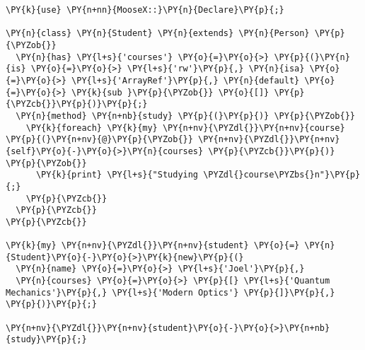 \begin{Verbatim}[commandchars=\\\{\}]
\PY{k}{use} \PY{n+nn}{MooseX::}\PY{n}{Declare}\PY{p}{;}

\PY{n}{class} \PY{n}{Student} \PY{n}{extends} \PY{n}{Person} \PY{p}{\PYZob{}}
  \PY{n}{has} \PY{l+s}{'courses'} \PY{o}{=}\PY{o}{>} \PY{p}{(}\PY{n}{is} \PY{o}{=}\PY{o}{>} \PY{l+s}{'rw'}\PY{p}{,} \PY{n}{isa} \PY{o}{=}\PY{o}{>} \PY{l+s}{'ArrayRef'}\PY{p}{,} \PY{n}{default} \PY{o}{=}\PY{o}{>} \PY{k}{sub }\PY{p}{\PYZob{}} \PY{o}{[]} \PY{p}{\PYZcb{}}\PY{p}{)}\PY{p}{;}
  \PY{n}{method} \PY{n+nb}{study} \PY{p}{(}\PY{p}{)} \PY{p}{\PYZob{}}
    \PY{k}{foreach} \PY{k}{my} \PY{n+nv}{\PYZdl{}}\PY{n+nv}{course} \PY{p}{(}\PY{n+nv}{@}\PY{p}{\PYZob{}} \PY{n+nv}{\PYZdl{}}\PY{n+nv}{self}\PY{o}{-}\PY{o}{>}\PY{n}{courses} \PY{p}{\PYZcb{}}\PY{p}{)} \PY{p}{\PYZob{}}
      \PY{k}{print} \PY{l+s}{"Studying \PYZdl{}course\PYZbs{}n"}\PY{p}{;}
    \PY{p}{\PYZcb{}}
  \PY{p}{\PYZcb{}}
\PY{p}{\PYZcb{}}

\PY{k}{my} \PY{n+nv}{\PYZdl{}}\PY{n+nv}{student} \PY{o}{=} \PY{n}{Student}\PY{o}{-}\PY{o}{>}\PY{k}{new}\PY{p}{(}
  \PY{n}{name} \PY{o}{=}\PY{o}{>} \PY{l+s}{'Joel'}\PY{p}{,}
  \PY{n}{courses} \PY{o}{=}\PY{o}{>} \PY{p}{[} \PY{l+s}{'Quantum Mechanics'}\PY{p}{,} \PY{l+s}{'Modern Optics'} \PY{p}{]}\PY{p}{,}
\PY{p}{)}\PY{p}{;}

\PY{n+nv}{\PYZdl{}}\PY{n+nv}{student}\PY{o}{-}\PY{o}{>}\PY{n+nb}{study}\PY{p}{;}
\end{Verbatim}

